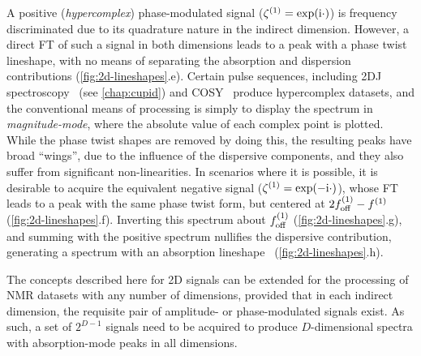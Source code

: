 A positive (\emph{hypercomplex}) phase-modulated signal ($\zeta^{(1)}
= \exp(\mathrm{i} \cdot)$) is frequency discriminated due to
its quadrature nature in the indirect dimension. However, a direct \ac{FT} of
such a signal in both dimensions leads to a peak with a phase twist lineshape,
with no means of
separating the absorption and dispersion contributions (\cref{fig:2d-lineshapes}.e). Certain pulse
sequences, including \ac{2DJ} spectroscopy~\cite{Aue1976,Morris2009} (see
\cref{chap:cupid}) and
\ac{COSY}~\cite{Jeener1971,Jeener2016,Aue1976a} produce hypercomplex datasets,
and the conventional means of processing is simply to display the
spectrum in \emph{magnitude-mode}, where the absolute value of each complex
point is plotted. While the phase twist shapes are removed by doing this, the
resulting peaks have broad ``wings'', due to the influence of the
dispersive components, and they also suffer from significant non-linearities.
In scenarios where it is possible, it is desirable to acquire the equivalent
negative signal ($\zeta^{(1)} = \exp(-\mathrm{i} \cdot)$), whose \ac{FT} leads to a
peak with the same phase twist form, but centered at $2f_{\mathrm{off}}^{(1)} - f^{(1)}$
(\cref{fig:2d-lineshapes}.f).
Inverting this spectrum about $f_{\mathrm{off}}^{(1)}$ (\cref{fig:2d-lineshapes}.g), and summing with the positive
spectrum nullifies the dispersive contribution, generating a spectrum with an
absorption lineshape~\cite{Davis1992} (\cref{fig:2d-lineshapes}.h).

The concepts described here for \ac{2D} signals can be extended for the
processing of \ac{NMR} datasets with any number of dimensions, provided that in
each indirect dimension, the requisite pair of amplitude- or phase-modulated
signals exist. As such, a set of $2^{D-1}$ signals need to be acquired to
produce $D$-dimensional spectra with absorption-mode peaks in all dimensions.

